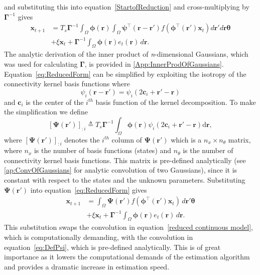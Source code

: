 \documentclass[5p,authoryear]{elsarticle}
\begin{document}
and substituting this into equation~\ref{StartofReduction} and cross-multiplying by $\boldsymbol{\Gamma}^{-1}$ gives
\begin{align}
    \label{eq:ReducedForm}
	 \mathbf{x}_{t+1} &= T_s\boldsymbol{\Gamma}^{-1}
	 \int_\Omega \boldsymbol{\phi}(\mathbf{r}) 
	 \int_\Omega \boldsymbol{\psi}^{\top} (\mathbf{r}-\mathbf{r}')f(\boldsymbol{\phi}^{\top}(\mathbf{r}')\mathbf{x}_t)d\mathbf{r}' d\mathbf{r} \boldsymbol{\theta}  \nonumber \\
	& + \xi\mathbf{x}_t + \boldsymbol{\Gamma}^{-1} \int_\Omega{\boldsymbol{\phi}(\mathbf{r}) e_t(\mathbf{r}) \, d\mathbf{r}}.
\end{align}
The analytic derivation of the inner product of \emph{n}-dimensional Gaussians, which was used for calculating $\mathbf\Gamma$, is provided in \ref{App:InnerProdOfGaussians}. Equation~\ref{eq:ReducedForm} can be simplified by exploiting the isotropy of the connectivity kernel basis functions where
\begin{equation}
	\psi_i (\mathbf{r}-\mathbf{r}') = \psi_i (2\mathbf{c}_i+\mathbf{r}'-\mathbf{r})
\end{equation}
and $\mathbf{c}_i$ is the center of the $i^{th}$ basis function of the kernel decomposition. To make the simplification we define
\begin{equation}\label{eq:DefPsi}
	\left[ \boldsymbol\Psi(\mathbf{r}')\right]_{:i}  \triangleq T_s\boldsymbol{\Gamma}^{-1}\int_\Omega {\boldsymbol{\phi}(\mathbf{r})\psi_i (2\mathbf{c}_i+\mathbf{r}'-\mathbf{r})\textrm{d}\mathbf{r}},
\end{equation}
where $\left[ \boldsymbol\Psi(\mathbf{r}')\right]_{:i}$ denotes the $i^{th}$ column of $\boldsymbol{\Psi}(\mathbf{r}')$ which is a $n_x \times n_{\theta}$ matrix, where $n_x$ is the number of basis functions (states) and $n_{\theta}$ is the number of connectivity kernel basis functions. This matrix is pre-defined analytically (see \ref{ap:ConvOfGaussians} for analytic convolution of two Gaussians), since it is constant with respect to the states and the unknown parameters. Substituting $\boldsymbol{\Psi}(\mathbf{r}')$ into equation~\ref{eq:ReducedForm} gives
\begin{align}
	\mathbf{x}_{t+1} &= \int_\Omega \boldsymbol{\Psi}(\mathbf{r}') f(\boldsymbol{\phi}^{\top}(\mathbf{r}')\mathbf{x}_t) \, d\mathbf{r}' \boldsymbol{\theta} \nonumber \\ &+ \xi\mathbf{x}_t 
+ \boldsymbol{\Gamma}^{-1} \int_\Omega{\boldsymbol{\phi}(\mathbf{r})e_t(\mathbf{r}) \, d\mathbf{r}}.
\end{align}
This substitution swaps the convolution in equation~\ref{reduced continuous model}, which is computationally demanding, with the convolution in equation~\ref{eq:DefPsi}, which is pre-defined analytically. This is of great importance as it lowers the computational demands of the estimation algorithm and provides a dramatic increase in estimation speed. 
\end{document}

